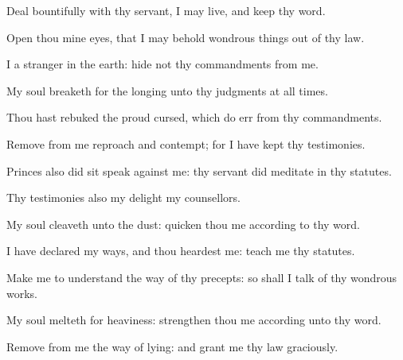 {\Q {}Deal
bountifully with thy
servant,
{} I may
live, and
keep thy
word.


\par }{\Q {}Open thou mine
eyes, that I may
behold wondrous
things out of thy
law.


\par }{\Q {}I
{} a
stranger in the
earth:
hide not thy
commandments from me.


\par }{\Q {}My
soul
breaketh for the
longing
{} unto thy
judgments at all
times.


\par }{\Q {}Thou hast
rebuked the
proud
{}
cursed, which do
err from thy
commandments.


\par }{\Q {}Remove from me
reproach and
contempt; for I have
kept thy
testimonies.


\par }{\Q {}Princes also did
sit
{}
speak against me:
{} thy
servant did
meditate in thy
statutes.


\par }{\Q {}Thy
testimonies also
{} my
delight
{} my
counsellors.


\par }{
\par }
{\Q {}My
soul
cleaveth unto the
dust:
quicken thou me according to thy
word.


\par }{\BB \par }
{\Q {}I have
declared my
ways, and thou
heardest me:
teach me thy
statutes.


\par }{\Q {}Make me to
understand the
way of thy
precepts: so shall I
talk of thy wondrous
works.


\par }{\BB \par }
{\Q {}My
soul
melteth for
heaviness:
strengthen thou me according unto thy
word.


\par }{\Q {}Remove from me the
way of
lying: and grant me thy
law
graciously.


\par }{\BB \par }
